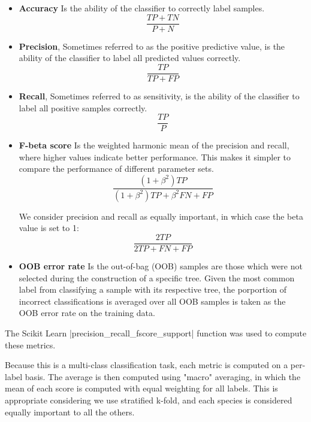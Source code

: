 \begin{itemize}
  \item \textbf{Accuracy}
    Is the ability of the classifier to correctly label samples.
    \begin{equation}
      \frac{TP+TN}{P+N}
    \end{equation}

  \item \textbf{Precision},
    Sometimes referred to as the positive predictive value, is the ability of the
    classifier to label all predicted values correctly.
    \begin{equation}
      \frac{TP}{TP+FP}
    \end{equation}

  \item \textbf{Recall},
    Sometimes referred to as sensitivity, is the ability of the classifier to
    label all positive samples correctly.
    \begin{equation}
      \frac{TP}{P}
    \end{equation}

  \item \textbf{F-beta score}
    Is the weighted harmonic mean of the precision and recall, where
    higher values indicate better performance.
    This makes it simpler to compare the performance of different parameter sets.
    \begin{equation}
      \frac{(1+\beta^2)TP}{(1+\beta^2)TP+\beta^2FN+FP}
    \end{equation}

    We consider precision and recall as equally important, in which case the
    beta value is set to 1:
    \begin{equation}
      \frac{2TP}{2TP+FN+FP}
    \end{equation}

  \item \textbf{OOB error rate}
    Is the out-of-bag (OOB) samples are those which were not selected during the
    construction of a specific tree.
    Given the most common label from classifying a sample with its respective tree,
    the porportion of incorrect classifications is averaged over all OOB samples
    is taken as the OOB error rate on the training data.

\end{itemize}

The Scikit Learn |precision_recall_fscore_support| function was used to compute
these metrics.

Because this is a multi-class classification task, each metric is computed
on a per-label basis.
The average is then computed using "macro" averaging, in which the mean of each
score is computed with equal weighting for all labels.
This is appropriate considering we use stratified k-fold, and each
species is considered equally important to all the others.

